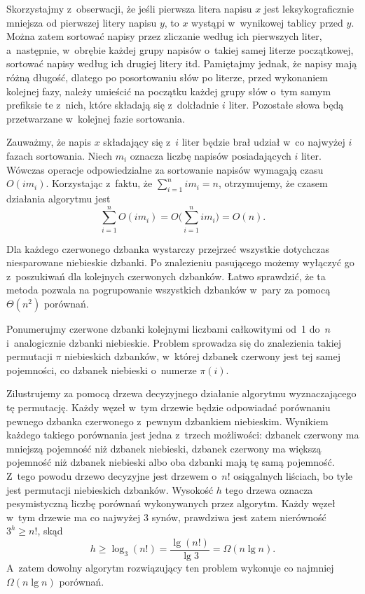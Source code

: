 \subproblem %
Skorzystajmy z~obserwacji, że jeśli pierwsza litera napisu $x$ jest leksykograficznie mniejsza od pierwszej litery napisu $y$, to $x$ wystąpi w~wynikowej tablicy przed $y$. Można zatem sortować napisy przez zliczanie według ich pierwszych liter, a~następnie, w~obrębie każdej grupy napisów o~takiej samej literze początkowej, sortować napisy według ich drugiej litery itd. Pamiętajmy jednak, że napisy mają różną długość, dlatego po posortowaniu słów po  literze, przed wykonaniem kolejnej fazy, należy umieścić na początku każdej grupy słów o~tym samym prefiksie  te z~nich, które składają się z~dokładnie $i$ liter. Pozostałe słowa będą przetwarzane w~kolejnej fazie sortowania.

Zauważmy, że napis $x$ składający się z~$i$ liter będzie brał udział w~co najwyżej $i$ fazach sortowania. Niech $m_i$ oznacza liczbę napisów posiadających $i$ liter. Wówczas operacje odpowiedzialne za sortowanie napisów  wymagają czasu $O(im_i)$. Korzystając z~faktu, że $\sum_{i=1}^nim_i=n$, otrzymujemy, że czasem działania algorytmu jest
\[
    \sum_{i=1}^nO(im_i) = O\biggl(\sum_{i=1}^nim_i\biggr) = O(n).
\]


\subproblem %
Dla każdego czerwonego dzbanka wystarczy przejrzeć wszystkie dotychczas niesparowane niebieskie dzbanki. Po znalezieniu pasującego możemy wyłączyć go z~poszukiwań dla kolejnych czerwonych dzbanków. Łatwo sprawdzić, że ta metoda pozwala na pogrupowanie wszystkich dzbanków w~pary za pomocą $\Theta(n^2)$ porównań.

\subproblem %
Ponumerujmy czerwone dzbanki kolejnymi liczbami całkowitymi od~1 do~$n$ i~analogicznie dzbanki niebieskie. Problem sprowadza się do znalezienia takiej permutacji $\pi$ niebieskich dzbanków, w~której  dzbanek czerwony jest tej samej pojemności, co dzbanek niebieski o~numerze $\pi(i)$.

Zilustrujemy za pomocą drzewa decyzyjnego działanie algorytmu wyznaczającego tę permutację. Każdy węzeł w~tym drzewie będzie odpowiadać porównaniu pewnego dzbanka czerwonego z~pewnym dzbankiem niebieskim. Wynikiem każdego takiego porównania jest jedna z~trzech możliwości: dzbanek czerwony ma mniejszą pojemność niż dzbanek niebieski, dzbanek czerwony ma większą pojemność niż dzbanek niebieski albo oba dzbanki mają tę samą pojemność. Z~tego powodu drzewo decyzyjne jest drzewem  o~$n!$ osiągalnych liściach, bo tyle jest permutacji niebieskich dzbanków. Wysokość $h$ tego drzewa oznacza pesymistyczną liczbę porównań wykonywanych przez algorytm. Każdy węzeł w~tym drzewie ma co najwyżej 3 synów, prawdziwa jest zatem nierówność $3^h\ge n!$, skąd
\[
	h \ge \log_3(n!) = \frac{\lg(n!)}{\lg3} = \Omega(n\lg n).
\]
A~zatem dowolny algorytm rozwiązujący ten problem wykonuje co najmniej $\Omega(n\lg n)$ porównań.

